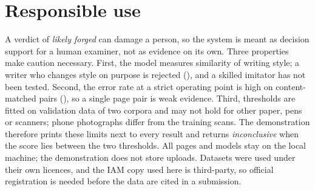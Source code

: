 \section{Responsible use}
\label{app:ethics}
A verdict of \emph{likely forged} can damage a person, so the system is meant as decision support for a human examiner, not as evidence on its own.
Three properties make caution necessary.
First, the model measures similarity of writing style; a writer who changes style on purpose is rejected (), and a skilled imitator has not been tested.
Second, the error rate at a strict operating point is high on content-matched pairs (), so a single page pair is weak evidence.
Third, thresholds are fitted on validation data of two corpora and may not hold for other paper, pens or scanners; phone photographs differ from the training scans.
The demonstration therefore prints these limits next to every result and returns \emph{inconclusive} when the score lies between the two thresholds.
All pages and models stay on the local machine; the demonstration does not store uploads.
Datasets were used under their own licences, and the IAM copy used here is third-party, so official registration is needed before the data are cited in a submission.

